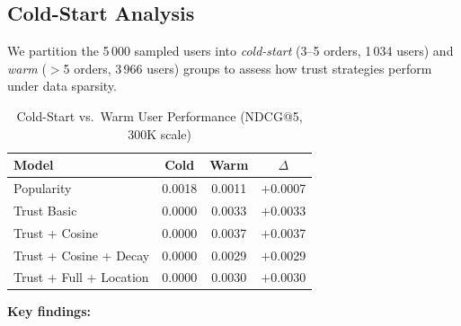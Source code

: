 \documentclass[conference]{IEEEtran}
\begin{document}
\subsection{Cold-Start Analysis}
\label{sec:coldstart}

We partition the 5\,000 sampled users into \emph{cold-start} (3--5
orders, 1\,034 users) and \emph{warm} ($>$5 orders, 3\,966 users)
groups to assess how trust strategies perform under data sparsity.

\begin{table}[h]
\centering
\caption{Cold-Start vs.\ Warm User Performance (NDCG@5, 300K scale)}
\label{tab:coldstart}
\begin{tabular}{lccc}
\toprule
\textbf{Model} & \textbf{Cold} & \textbf{Warm} & \textbf{$\Delta$} \\
\midrule
Popularity              & 0.0018 & 0.0011 & $+$0.0007 \\
Trust Basic             & 0.0000 & 0.0033 & $+$0.0033 \\
Trust + Cosine          & 0.0000 & 0.0037 & $+$0.0037 \\
Trust + Cosine + Decay  & 0.0000 & 0.0029 & $+$0.0029 \\
Trust + Full + Location & 0.0000 & 0.0030 & $+$0.0030 \\
\bottomrule
\end{tabular}
\end{table}

\textbf{Key findings:}
\end{document}
